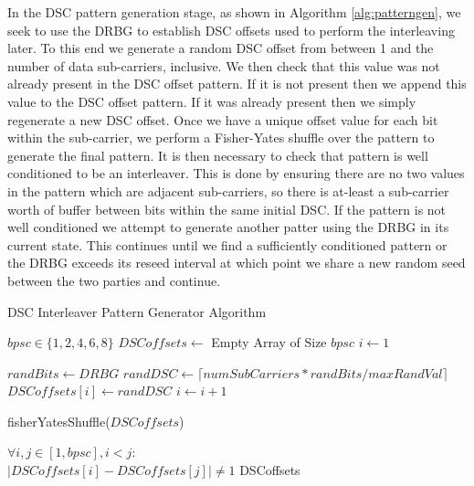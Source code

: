 \documentclass[sigconf]{acmart}
\begin{document}
In the DSC pattern generation stage, as shown in Algorithm \ref{alg:patterngen}, we seek to use the DRBG to establish DSC offsets used to perform the interleaving later. To this end we generate a random DSC offset from between 1 and the number of data sub-carriers, inclusive. We then check that this value was not already present in the DSC offset pattern. If it is not present then we append this value to the DSC offset pattern. If it was already present then we simply regenerate a new DSC offset. Once we have a unique offset value for each bit within the sub-carrier, we perform a Fisher-Yates shuffle over the pattern to generate the final pattern\cite{fisher1943statistical}. It is then necessary to check that pattern is well conditioned to be an interleaver. This is done by ensuring there are no two values in the pattern which are adjacent sub-carriers, so there is at-least a sub-carrier worth of buffer between bits within the same initial DSC. If the pattern is not well conditioned we attempt to generate another patter using the DRBG in its current state. This continues until we find a sufficiently conditioned pattern or the DRBG exceeds its reseed interval at which point we share a new random seed between the two parties and continue.

\begin{algorithm}[ht]
\caption{DSC Interleaver Pattern Generator Algorithm}
\label{alg:patterngen}
\begin{algorithmic}

\REQUIRE $bpsc \in \{1,2,4,6,8\}$
\STATE $DSCoffsets \leftarrow $ Empty Array of Size $bpsc$
\STATE $i \leftarrow 1$
\STATE

    \STATE $randBits \leftarrow DRBG$
    \STATE $randDSC \leftarrow \lceil numSubCarriers * randBits / maxRandVal \rceil$
        \STATE $DSCoffsets[i] \leftarrow randDSC$
        \STATE $i \leftarrow i + 1$
    \ENDIF
\ENDWHILE
\STATE

\STATE fisherYatesShuffle($DSCoffsets$)
\STATE 

\ENSURE $\forall i,j \in [1, bpsc], i < j:$ \\ $|DSCoffsets[i]-DSCoffsets[j]| \neq 1$
\RETURN DSCoffsets
\end{algorithmic}
\end{algorithm}
\end{document}
